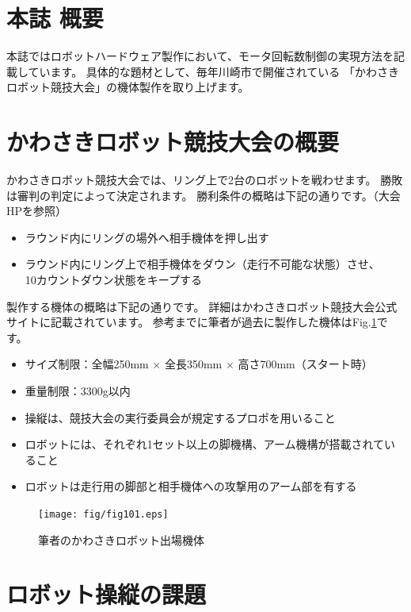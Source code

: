 \section{本誌 概要}\label{ux6628ux4ecaux306ediyux4e8bux60c5}

本誌ではロボットハードウェア製作において、モータ回転数制御の実現方法を記載しています。
具体的な題材として、毎年川崎市で開催されている
「かわさきロボット競技大会」の機体製作を取り上げます。

\section{かわさきロボット競技大会の概要}\label{ux672cux8a8cux306eux4e2dux8eab}

かわさきロボット競技大会では、リング上で2台のロボットを戦わせます。
勝敗は審判の判定によって決定されます。
勝利条件の概略は下記の通りです。（大会HP\cite{kawasaki_public_HP}を参照）

\begin{itemize}
\tightlist
\item
  ラウンド内にリングの場外へ相手機体を押し出す
\item
  ラウンド内にリング上で相手機体をダウン（走行不可能な状態）させ、\\
  10カウントダウン状態をキープする
\end{itemize}

製作する機体の概略は下記の通りです。
詳細はかわさきロボット競技大会公式サイト\cite{kawasaki_public_HP}に記載されています。
参考までに筆者が過去に製作した機体はFig.\ref{fig101}です。

\begin{itemize}
\tightlist
\item
  サイズ制限：全幅250mm × 全長350mm × 高さ700mm（スタート時）
\item
  重量制限：3300g以内
\item
  操縦は、競技大会の実行委員会が規定するプロポを用いること
\item
  ロボットには、それぞれ1セット以上の脚機構、アーム機構が搭載されていること
\item
  ロボットは走行用の脚部と相手機体への攻撃用のアーム部を有する
\end{itemize}

\begin{figure}[htbp]
\centering
\texttt{[image: fig/fig101.eps]}
\caption{筆者のかわさきロボット出場機体}
\label{fig101}
\end{figure}


\section{ロボット操縦の課題}\label{ux672cux8a8cux306eux5bfeux8c61ux8005}


